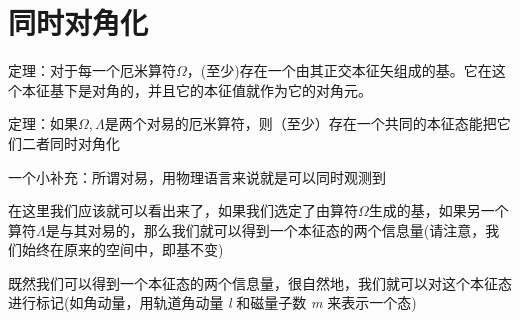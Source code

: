 \section{同时对角化}
定理：对于每一个厄米算符$\Omega$，(至少)存在一个由其正交本征矢组成的基。它在这个本征基下是对角的，并且它的本征值就作为它的对角元。\par
定理：如果$\Omega ,\Lambda $是两个对易的厄米算符，则（至少）存在一个共同的本征态能把它们二者同时对角化\par
一个小补充：所谓对易，用物理语言来说就是可以同时观测到\par
在这里我们应该就可以看出来了，如果我们选定了由算符$\Omega$生成的基，如果另一个算符$\Lambda $是与其对易的，那么我们就可以得到一个本征态的两个信息量(请注意，我们始终在原来的空间中，即基不变)\par
既然我们可以得到一个本征态的两个信息量，很自然地，我们就可以对这个本征态进行标记(如角动量，用轨道角动量 \textit{l} 和磁量子数 \textit{m} 来表示一个态)